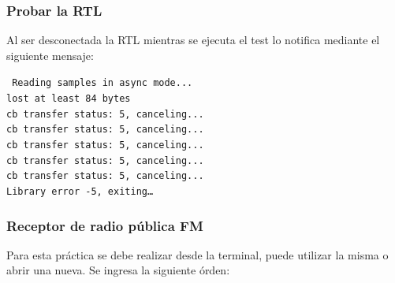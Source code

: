 \begin{frame}
\frametitle{Probar la RTL}

Al ser desconectada la RTL mientras se ejecuta el test lo notifica mediante el siguiente mensaje: 

\begin{block}{}
    \texttt{
    Reading samples in async mode... \\
    lost at least 84 bytes \\
    cb transfer status: 5, canceling... \\
    cb transfer status: 5, canceling... \\
    cb transfer status: 5, canceling... \\
    cb transfer status: 5, canceling... \\
    cb transfer status: 5, canceling... \\\vspace{2mm}
    Library error -5, exiting…\\}
\end{block}

\end{frame}

\begin{frame}
\frametitle{Receptor de radio pública FM}

\vspace{2mm}
Para esta práctica se debe realizar desde la terminal, puede utilizar la misma o abrir una nueva. Se ingresa la siguiente órden:


\end{frame}

